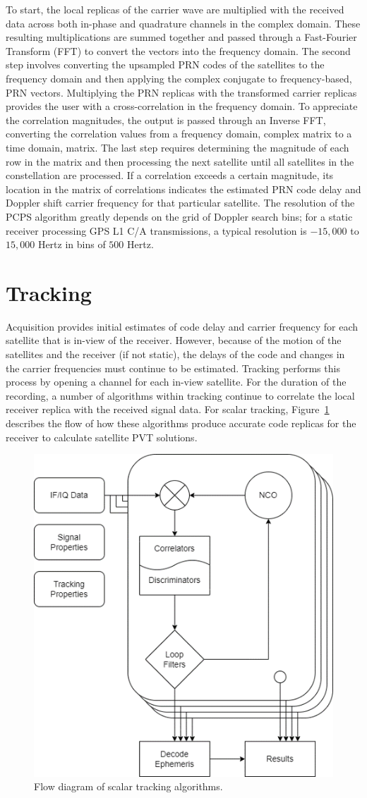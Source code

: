 To start, the local replicas of the carrier wave are multiplied with the received data across both in-phase and quadrature channels in the complex domain. These resulting multiplications are summed together and passed through a Fast-Fourier Transform (FFT) to convert the vectors into the frequency domain. The second step involves converting the upsampled PRN codes of the satellites to the frequency domain and then applying the complex conjugate to frequency-based, PRN vectors. Multiplying the PRN replicas with the transformed carrier replicas provides the user with a cross-correlation in the frequency domain. To appreciate the correlation magnitudes, the output is passed through an Inverse FFT, converting the correlation values from a frequency domain, complex matrix to a time domain, matrix. The last step requires determining the magnitude of each row in the matrix and then processing the next satellite until all satellites in the constellation are processed. If a correlation exceeds a certain magnitude, its location in the matrix of correlations indicates the estimated PRN code delay and Doppler shift carrier frequency for that particular satellite. The resolution of the PCPS algorithm greatly depends on the grid of Doppler search bins; for a static receiver processing GPS L1 C/A transmissions, a typical resolution is \(-15,000\) to \(15,000\) Hertz in bins of \(500\) Hertz.

\section{Tracking}
Acquisition provides initial estimates of code delay and carrier frequency for each satellite that is in-view of the receiver. However, because of the motion of the satellites and the receiver (if not static), the delays of the code and changes in the carrier frequencies must continue to be estimated. Tracking performs this process by opening a channel for each in-view satellite. For the duration of the recording, a number of algorithms within tracking continue to correlate the local receiver replica with the received signal data. For scalar tracking, Figure~\ref{fig:scalartracking} describes the flow of how these algorithms produce accurate code replicas for the receiver to calculate satellite PVT solutions.

\begin{figure}[!ht]\label{fig:scalartracking}
    \centering
    \includegraphics[width=0.5\linewidth]{Figures/scalartracking.png}
    \caption{Flow diagram of scalar tracking algorithms.}
\end{figure}


